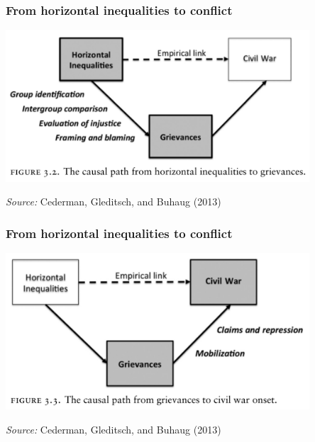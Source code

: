 \documentclass[utf8, xcolor=dvipsnames]{beamer}
\begin{document}
\begin{frame}
\frametitle{From horizontal inequalities to conflict}
\centering

\includegraphics[width = 0.85\textwidth]{img/cgb_causal1}

\vspace{15pt}

{\small \textit{Source:} Cederman, Gleditsch, and Buhaug (2013)}

\end{frame}

\begin{frame}
\frametitle{From horizontal inequalities to conflict}
\centering

\includegraphics[width = 0.85\textwidth]{img/cgb_causal2}

\vspace{15pt}

{\small \textit{Source:} Cederman, Gleditsch, and Buhaug (2013)}

\end{frame}
\end{document}
